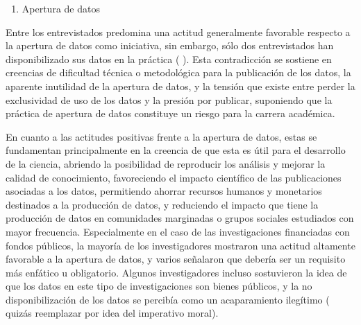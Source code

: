 \documentclass[
  letterpaper,
  DIV=11,
  numbers=noendperiod]{scrreprt}
\providecommand{\tightlist}{%
  \setlength{\itemsep}{0pt}\setlength{\parskip}{0pt}}\usepackage{longtable,booktabs,array}
\begin{document}
\begin{enumerate}
\def\labelenumi{\alph{enumi})}
\setcounter{enumi}{2}
\tightlist
\item
  Apertura de datos
\end{enumerate}

Entre los entrevistados predomina una actitud generalmente favorable
respecto a la apertura de datos como iniciativa, sin embargo, sólo dos
entrevistados han disponibilizado sus datos en la práctica ( ). Esta
contradicción se sostiene en creencias de dificultad técnica o
metodológica para la publicación de los datos, la aparente inutilidad de
la apertura de datos, y la tensión que existe entre perder la
exclusividad de uso de los datos y la presión por publicar, suponiendo
que la práctica de apertura de datos constituye un riesgo para la
carrera académica.

En cuanto a las actitudes positivas frente a la apertura de datos, estas
se fundamentan principalmente en la creencia de que esta es útil para el
desarrollo de la ciencia, abriendo la posibilidad de reproducir los
análisis y mejorar la calidad de conocimiento, favoreciendo el impacto
científico de las publicaciones asociadas a los datos, permitiendo
ahorrar recursos humanos y monetarios destinados a la producción de
datos, y reduciendo el impacto que tiene la producción de datos en
comunidades marginadas o grupos sociales estudiados con mayor
frecuencia. Especialmente en el caso de las investigaciones financiadas
con fondos públicos, la mayoría de los investigadores mostraron una
actitud altamente favorable a la apertura de datos, y varios señalaron
que debería ser un requisito más enfático u obligatorio. Algunos
investigadores incluso sostuvieron la idea de que los datos en este tipo
de investigaciones son bienes públicos, y la no disponibilización de los
datos se percibía como un acaparamiento ilegítimo ( quizás reemplazar
por idea del imperativo moral).
\end{document}
